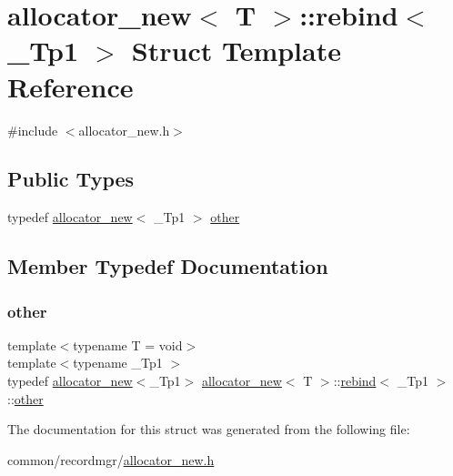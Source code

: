 \hypertarget{structallocator__new_1_1rebind}{}\section{allocator\+\_\+new$<$ T $>$\+:\+:rebind$<$ \+\_\+\+Tp1 $>$ Struct Template Reference}
\label{structallocator__new_1_1rebind}


{\ttfamily \#include $<$allocator\+\_\+new.\+h$>$}

\subsection*{Public Types}
\begin{DoxyCompactItemize}
\item 
typedef \hyperlink{classallocator__new}{allocator\+\_\+new}$<$ \+\_\+\+Tp1 $>$ \hyperlink{structallocator__new_1_1rebind_a6bdfff98a231e3688f0dac6da010da48}{other}
\end{DoxyCompactItemize}


\subsection{Member Typedef Documentation}
\mbox{\label{structallocator__new_1_1rebind_a6bdfff98a231e3688f0dac6da010da48}} 
\subsubsection{\texorpdfstring{other}{other}}
{\footnotesize\ttfamily template$<$typename T  = void$>$ \\
template$<$typename \+\_\+\+Tp1 $>$ \\
typedef \hyperlink{classallocator__new}{allocator\+\_\+new}$<$\+\_\+\+Tp1$>$ \hyperlink{classallocator__new}{allocator\+\_\+new}$<$ T $>$\+::\hyperlink{structallocator__new_1_1rebind}{rebind}$<$ \+\_\+\+Tp1 $>$\+::\hyperlink{structallocator__new_1_1rebind_a6bdfff98a231e3688f0dac6da010da48}{other}}



The documentation for this struct was generated from the following file\+:\begin{DoxyCompactItemize}
\item 
common/recordmgr/\hyperlink{allocator__new_8h}{allocator\+\_\+new.\+h}\end{DoxyCompactItemize}
